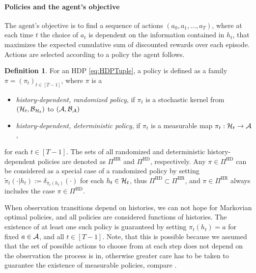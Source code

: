 \documentclass[
    a4paper,
    11pt,
    bibliography=totoc,
    listof=totoc,      
    headinclude=true,
    cleardoublepage=empty,
]{scrbook}
\theoremstyle{plain}
\theoremstyle{definition}
\newtheorem{definition}[theorem]{Definition}
\theoremstyle{remark}
\newcommand{\SpaceA}{{\cal A}}
\newcommand{\SpaceH}{{\cal H}}
\begin{document}
\paragraph{Policies and the agent's objective}
The agent's objective is to find a sequence of actions $(a_0,a_1,\dots,a_T)$, 
where at each time $t$ the choice of $a_t$ is dependent on the information 
contained in $h_t$, that maximizes the expected cumulative sum of discounted 
rewards over each episode. Actions are selected according to a policy the 
agent follows.
\begin{definition}
\label{def:HDPPolicy}
    For an HDP \eqref{eq:HDPTuple}, a policy is defined as a family $\pi =
    (\pi_t)_{t\in[T-1]}$, where $\pi$ is a
    \begin{itemize}
        \item \textit{history-dependent, randomized policy}, if $\pi_t$ is a
        stochastic kernel from $(\SpaceH_t,\mathcal{B}_{\SpaceH_t})$ to 
        $(\SpaceA,\mathcal{B}_\SpaceA)$
        
        \item \textit{history-dependent, deterministic policy}, if $\pi_t$ is 
        a measurable map $\pi_t:\SpaceH_t\to\SpaceA$,
    \end{itemize}
    for each $t\in[T-1]$. The sets of all randomized and deterministic 
    history-dependent policies are denoted as $\Pi^{\text{HR}}$ and 
    $\Pi^{\text{HD}}$, respectively. Any $\pi\in\Pi^{\text{HD}}$ can be
    considered as a special case of a randomized policy by setting 
    $\tilde \pi_t(\cdot|h_t) := \delta_{\pi_t(h_t)}(\cdot)$ for each 
    $h_t\in\SpaceH_t$, thus $\Pi^{\text{HD}}\subset\Pi^{\text{HR}}$, and 
    $\pi\in\Pi^\text{HR}$ always includes the case $\pi\in\Pi^\text{HD}$.
\end{definition}
When observation transitions depend on histories, we can not hope for
Markovian optimal policies, and all policies are considered functions of
histories. The existence of at least one such policy is guaranteed by setting
$\pi_t(h_t) = a$ for fixed $a\in\SpaceA$, and all $t\in[T-1]$. Note,
that this is possible because we assumed that the set of possible actions to 
choose from at each step does not depend on the observation the process is in, 
otherwise greater care has to be taken to guarantee the existence of measurable
policies, compare \cite[Chapter~16]{hinderer2016_do}.
\end{document}
